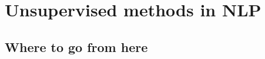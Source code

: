 \chapter{\label{chap:unsupervised-ml}Unsupervised methods in NLP}

\section*{Where to go from here}
